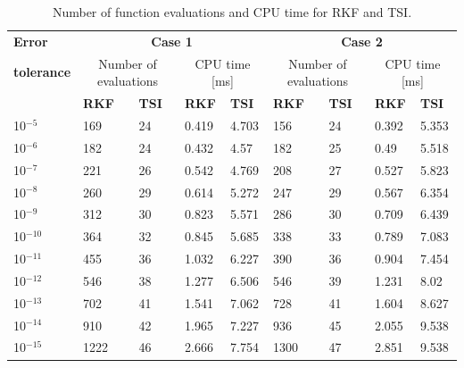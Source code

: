\begin{table}[H]
\begin{center}
\caption{Number of function evaluations and CPU time for \ac{RKF} and \ac{TSI}.}
\label{tab:RKFvsTSIfunctionEvaluationAndCPUtime}
\begin{tabular}{|l|p{1.5cm}|p{1.5cm}|l|l|p{1.5cm}|p{1.5cm}|l|l|}
\hline 
\textbf{Error}  & \multicolumn{4}{c|}{\textbf{Case 1}} & \multicolumn{4}{c|}{\textbf{Case 2}} \\ \cline{2-9}

\textbf{tolerance} & \multicolumn{2}{c|}{Number of evaluations} & \multicolumn{2}{c|}{CPU time [ms]}& \multicolumn{2}{c|}{Number of evaluations} & \multicolumn{2}{c|}{CPU time [ms]} \\ \cline{2-9}

& \textbf{\ac{RKF}} &
\textbf{\ac{TSI}} & \textbf{\ac{RKF}} & \textbf{\ac{TSI}} & \textbf{\ac{RKF}} &
\textbf{\ac{TSI}} & \textbf{\ac{RKF}} & \textbf{\ac{TSI}} \\ \hline \hline

10$^{-5}$ & 169 & 24 & 0.419 &4.703 &156 &24 &0.392 &5.353 \\ \hline
10$^{-6}$ & 182 & 24 & 0.432 &4.57 &182 &25 &0.49 &5.518 \\ \hline
10$^{-7}$ & 221 & 26 & 0.542 &4.769 &208 &27 &0.527 &5.823 \\ \hline
10$^{-8}$ & 260 & 29 & 0.614 &5.272 &247 &29 &0.567 &6.354 \\ \hline
10$^{-9}$ & 312 & 30 & 0.823 &5.571 &286 &30 &0.709 &6.439 \\ \hline
10$^{-10}$ & 364 & 32 & 0.845 &5.685 &338 &33 &0.789 &7.083 \\ \hline
10$^{-11}$ & 455 & 36 & 1.032 &6.227 &390 &36 &0.904 &7.454 \\ \hline
10$^{-12}$ & 546 & 38 & 1.277 &6.506 &546 &39 &1.231 &8.02 \\ \hline
10$^{-13}$ & 702 & 41 & 1.541 &7.062 &728 &41 &1.604 &8.627 \\ \hline
10$^{-14}$ & 910 & 42 & 1.965 &7.227 &936 &45 &2.055 &9.538 \\ \hline
10$^{-15}$ & 1222 & 46 & 2.666 &7.754 &1300 &47 &2.851 &9.538 \\ \hline


\end{tabular}
\end{center}
\end{table}

